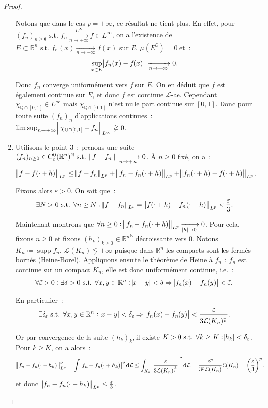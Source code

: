 \documentclass{article}
\newcommand{\pinfty}{{+\infty}}
\newcommand{\st}{\text{ s.t. }}
\newcommand{\C}{\complement}
\newcommand{\N}{{\mathbb N}}
\newcommand{\Q}{{\mathbb Q}}
\newcommand{\R}{{\mathbb R}}
\DeclareMathOperator{\supp}{supp}
\begin{document}
\begin{proof}
\begin{enumerate}
	Notons que dans le cas $p = \pinfty$, ce résultat ne tient plus. En effet, pour $(f_n)_{n \geq 0} \st f_n \xrightarrow[n \to \pinfty]{L^\infty} f \in L^\infty$, on a
	l'existence de $E \subset \R^n \st f_n(x) \xrightarrow[n \to \pinfty]{} f(x)$ sur $E$, $\mu(E^\C) = 0$ et~:
	\[\sup_{x \in E}\abs {f_n(x)-f(x)} \xrightarrow[n \to \pinfty]{} 0.\]

	Donc $f_n$ converge uniformément vers $f$ sur $E$. On en déduit que $f$ est également continue sur $E$, et donc $f$ est continue $\mathcal L$-ae. Cependant
	$\chi_{\Q \cap [0, 1]} \in L^\infty$ mais $\chi_{\Q \cap [0, 1]}$ n'est nulle part continue sur $[0, 1]$. Donc pour toute suite $(f_n)_n$ d'applications continues~:
	$\limsup_{n \to \pinfty}\norm {\chi_{\Q \cap [0, 1]}-f_n}_{L^\infty} \gneqq 0$.

	\item Utilisons le point 3~: prenons une suite $(f_n)_{n \geq 0} \in C_c^0(\R^n)^\N \st \norm {f-f_n} \xrightarrow[n \to \pinfty]{} 0$. À $n \geq 0$ fixé, on a~:
	\[\norm {f-f(\cdot+h)}_{L^p} \leq \norm {f-f_n}_{L^p} + \norm {f_n-f_n(\cdot + h)}_{L^p} + \norm {f_n(\cdot+h)-f(\cdot+h)}_{L^p}.\]

	Fixons alors $\varepsilon > 0$. On sait que~:
	\[\exists N > 0 \st \forall n \geq N : \norm {f-f_n}_{L^p} = \norm {f(\cdot+h)-f_n(\cdot+h)}_{L^p} < \frac \varepsilon3.\]

	Maintenant montrons que $\forall n \geq 0 : \norm {f_n-f_n(\cdot+h)}_{L^p} \xrightarrow[\abs h \to 0]{} 0$. Pour cela, fixons $n \geq 0$ et fixons
	$(h_k)_{k \geq 0} \in {\R^n}^\N$ décroissante vers $0$. Notons $K_n \coloneqq \supp f_n$. $\mathcal L(K_n) \lneqq \pinfty$ puisque dans $\R^n$ les compacts sont les fermés bornés
	(Heine-Borel). Appliquons ensuite le théorème de Heine à $f_n$~: $f_n$ est continue sur un compact $K_n$, elle est donc uniformément continue, i.e.~:
	\[\forall \tilde \varepsilon > 0 : \exists \delta > 0 \st \forall x, y \in \R^n : \abs {x-y} < \delta \Rightarrow \abs {f_n(x)-f_n(y)} < \tilde \varepsilon.\]

	En particulier~:
	\[\exists \delta_\varepsilon \st \forall x, y \in \R^n : \abs {x-y} < \delta_\varepsilon \Rightarrow \abs {f_n(x)-f_n(y)} < \frac {\varepsilon}{3\mathcal L(K_n)^{\frac 1p}}.\]

	Or par convergence de la suite $(h_k)_k$, il existe $K > 0 \st \forall k \geq K : \abs {h_k} < \delta_\varepsilon$. Pour $k \geq K$, on a alors~:
	\[\norm {f_n-f_n(\cdot+h_k)}_{L^p}^p = \int\abs {f_n-f_n(\cdot+h_k)}^p\dif\mathcal L \leq \int_{K_n}\abs {\frac {\varepsilon}{3\mathcal L(K_n)^{\frac 1p}}}^p\dif\mathcal L
		= \frac {\varepsilon^p}{3^p\mathcal L(K_n)}\mathcal L(K_n) = \left(\frac \varepsilon3\right)^p,\]
	et donc $\norm {f_n-f_n(\cdot+h_k)}_{L^p} \leq \frac \varepsilon3$.


\end{enumerate}
\end{proof}
\end{document}
